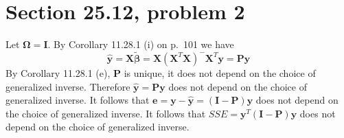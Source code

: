 \section{Section 25.12, problem 2}
Let $\bm\Omega=\mathbf I$.
By Corollary 11.28.1 (i) on p.\ 101 we have
$$\mathbf{\hat y}=
\mathbf X\bm{\tilde\beta}=\mathbf X(\mathbf X^T
\mathbf X)^{-{}}\mathbf X^T\mathbf y=\mathbf{Py}$$
By Corollary 11.28.1 (e), $\mathbf P$ is unique, it does not
depend on the choice of generalized inverse.
Therefore $\mathbf{\hat y}=\mathbf{Py}$ does not depend on the choice of
generalized inverse.
It follows that $\mathbf e=\mathbf y-\mathbf{\hat y}
=(\mathbf I-\mathbf P)\mathbf y$ does not
depend on the choice of generalized inverse.
It follows that $SSE=\mathbf y^T(\mathbf I-\mathbf P)\mathbf y$ does not depend on the
choice of generalized inverse.
